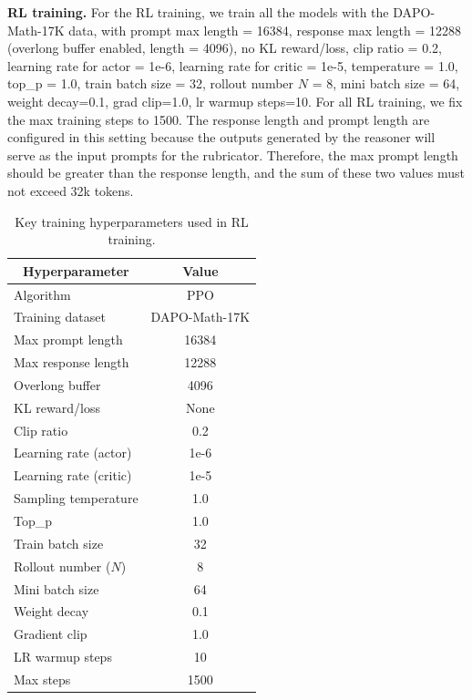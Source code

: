 \clearpage
\textbf{RL training. }
For the RL training, we train all the models with the DAPO-Math-17K data, with prompt max length = 16384, response max length = 12288 (overlong buffer enabled, length = 4096), no KL reward/loss, clip ratio = 0.2, learning rate for actor = 1e-6, learning rate for critic = 1e-5, temperature = 1.0, top\_p = 1.0, train batch size = 32, rollout number $N$ = 8, mini batch size = 64, weight decay=0.1, grad clip=1.0, lr warmup steps=10. 
For all RL training, we fix the max training steps to 1500.
The response length and prompt length are configured in this setting because the outputs generated by the reasoner will serve as the input prompts for the rubricator. Therefore, the max prompt length should be greater than the response length, and the sum of these two values must not exceed 32k tokens. 


\begin{table}[h]
\centering
\begin{tabularx}{0.4\linewidth}{l|c}
  \toprule
\multicolumn{1}{c}{\textbf{Hyperparameter}} \vline & \multicolumn{1}{c}{\textbf{Value}} \\
\midrule
\small
Algorithm                             & PPO \\
Training dataset                      & DAPO-Math-17K \\
Max prompt length                     & 16384 \\
Max response length                   & 12288 \\
Overlong buffer                       & 4096 \\
KL reward/loss                        & None \\
Clip ratio                            & 0.2 \\
Learning rate (actor)                 & 1e-6 \\
Learning rate (critic)                & 1e-5 \\
Sampling temperature                  & 1.0 \\
Top\_p                                & 1.0 \\
Train batch size                      & 32 \\
Rollout number ($N$)                  & 8 \\
Mini batch size                       & 64 \\
Weight decay                          & 0.1 \\
Gradient clip                         & 1.0 \\
LR warmup steps                       & 10 \\
Max steps                             & 1500 \\
\bottomrule
\end{tabularx}
\caption{Key training hyperparameters used in RL training.}
\label{tab:rl_hyper}
\end{table}


